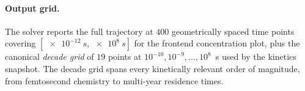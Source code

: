 \paragraph{Output grid.}
The solver reports the full trajectory at $400$ geometrically spaced time points covering $[\SI{e-12}{s}, \SI{e8}{s}]$ for the frontend concentration plot, plus the canonical \emph{decade grid} of $19$ points at $10^{-10}, 10^{-9}, \ldots, 10^{8}$~s used by the kinetics snapshot. The decade grid spans every kinetically relevant order of magnitude, from femtosecond chemistry to multi-year residence times.
